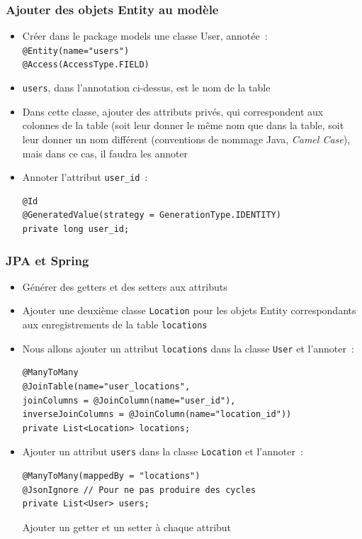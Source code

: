 \documentclass{beamer}
\begin{document}
\begin{frame}[fragile]
	\frametitle{Ajouter des objets Entity au modèle}
	\begin{itemize}
		\item Créer dans le package models une classe User, annotée~:
		\texttt{@Entity(name="users")\\@Access(AccessType.FIELD)}
		\item[] \texttt{users}, dans l'annotation ci-dessus, est le nom de la table
		\item Dans cette classe, ajouter des attributs privés, qui correspondent aux colonnes de la table (soit leur donner le même nom que dans la table, soit leur donner un nom différent (conventions de nommage Java, \textit{Camel Case}), mais dans ce cas, il faudra les annoter
		\item Annoter l'attribut \texttt{user\_id}~:\\
\begin{lstlisting}
@Id
@GeneratedValue(strategy = GenerationType.IDENTITY)
private long user_id;
\end{lstlisting}
		
	\end{itemize}
\end{frame} 

\begin{frame}[fragile]
	\frametitle{JPA et Spring}
	\begin{itemize}
		\item Générer des getters et des setters aux attributs
		\item Ajouter une deuxième classe \texttt{Location} pour les objets Entity correspondants aux enregistrements de la table \texttt{locations}
		\item Nous allons ajouter un attribut \texttt{locations} dans la classe \texttt{User} et l'annoter~:
\begin{lstlisting}
@ManyToMany
@JoinTable(name="user_locations",
joinColumns = @JoinColumn(name="user_id"),
inverseJoinColumns = @JoinColumn(name="location_id"))
private List<Location> locations;
\end{lstlisting}
		\item Ajouter un attribut \texttt{users} dans la classe \texttt{Location} et l'annoter~:
\begin{lstlisting}
@ManyToMany(mappedBy = "locations")
@JsonIgnore // Pour ne pas produire des cycles
private List<User> users;
\end{lstlisting}
Ajouter un getter et un setter à chaque attribut
	\end{itemize}
\end{frame} 
\end{document}

